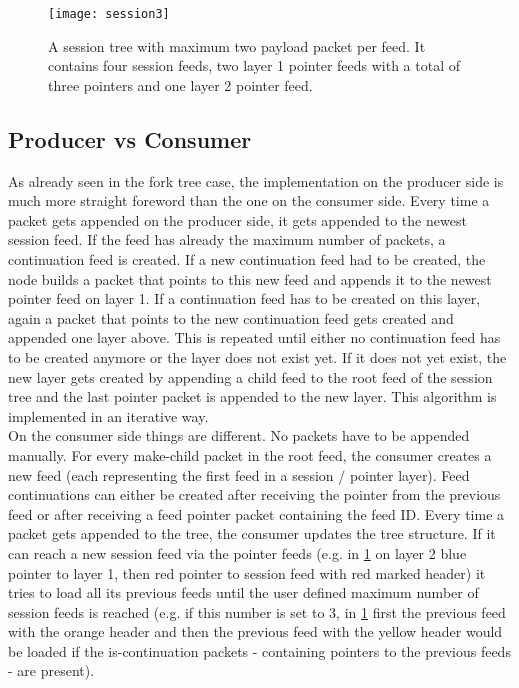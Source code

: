 \begin{figure}
\centering
\texttt{[image: session3]}
\caption{A session tree with maximum two payload packet per feed. It contains four session feeds, two layer 1 pointer feeds with a total of three pointers and one layer 2 pointer feed.}
\label{fig:session3}
\end{figure}



\subsection{Producer vs Consumer}
As already seen in the fork tree case, the implementation on the producer side is much more straight foreword than the one on the consumer side. Every time a packet gets appended on the producer side, it gets appended to the newest session feed. If the feed has already the maximum number of packets, a continuation feed is created. If a new continuation feed had to be created, the node builds a packet that points to this new feed and appends it to the newest pointer feed on layer 1. If a continuation feed has to be created on this layer, again a packet that points to the new continuation feed gets created and appended one layer above. This is repeated until either no continuation feed has to be created anymore or the layer does not exist yet. If it does not yet exist, the new layer gets created by appending a child feed to the root feed of the session tree and the last pointer packet is appended to the new layer. This algorithm is implemented in an iterative way. \\
On the consumer side things are different. No packets have to be appended manually. For every make-child packet in the root feed, the consumer creates a new feed (each representing the first feed in a session / pointer layer). Feed continuations can either be created after receiving the pointer from the previous feed or after receiving a feed pointer packet containing the feed ID. Every time a packet gets appended to the tree, the consumer updates the tree structure. If it can reach a new session feed via the pointer feeds (e.g. in \cref{fig:session3} on layer 2 blue pointer to layer 1, then red pointer to session feed with red marked header) it tries to load all its previous feeds until the user defined maximum number of session feeds is reached (e.g. if this number is set to 3, in \cref{fig:session3} first the previous feed with the orange header and then the previous feed with the yellow header would be loaded if the is-continuation packets - containing pointers to the previous feeds - are present). \\
